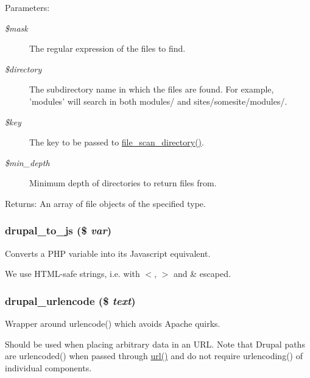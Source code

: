 \begin{Desc}
\item[Parameters:]
\begin{description}
\item[{\em \$mask}]The regular expression of the files to find. \item[{\em \$directory}]The subdirectory name in which the files are found. For example, 'modules' will search in both modules/ and sites/somesite/modules/. \item[{\em \$key}]The key to be passed to \hyperlink{group__file_g374c73d3fe4f45c2d64a5fb0b22cb118}{file\_\-scan\_\-directory()}. \item[{\em \$min\_\-depth}]Minimum depth of directories to return files from.\end{description}
\end{Desc}
\begin{Desc}
\item[Returns:]An array of file objects of the specified type. \end{Desc}
\hypertarget{common_8inc_99da8b132160dbf03c14388e92cd9baf}{
\subsubsection[{drupal\_\-to\_\-js}]{\setlength{\rightskip}{0pt plus 5cm}drupal\_\-to\_\-js (\$ {\em var})}}
\label{common_8inc_99da8b132160dbf03c14388e92cd9baf}


Converts a PHP variable into its Javascript equivalent.

We use HTML-safe strings, i.e. with $<$, $>$ and \& escaped. \hypertarget{common_8inc_8478a3dfd0413b75418465e063d7f601}{
\subsubsection[{drupal\_\-urlencode}]{\setlength{\rightskip}{0pt plus 5cm}drupal\_\-urlencode (\$ {\em text})}}
\label{common_8inc_8478a3dfd0413b75418465e063d7f601}


Wrapper around urlencode() which avoids Apache quirks.

Should be used when placing arbitrary data in an URL. Note that Drupal paths are urlencoded() when passed through \hyperlink{common_8inc_7ef60c766e2d09e18b866dacf6b9eb1f}{url()} and do not require urlencoding() of individual components.

